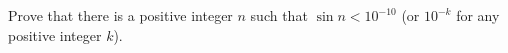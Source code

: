 Prove that there is a positive integer $n$ such that $\sin n < 10^{-10}$ (or $10^{-k}$ for any positive integer $k$).
